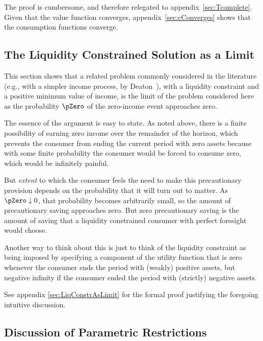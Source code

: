 \documentclass[titlepage]{\econtex}\providecommand{\texname}{BufferStockTheory}
\begin{document}
The proof is cumbersome, and therefore relegated to
appendix~\ref{sec:Tcomplete}.  Given that the value function
converges, appendix~\ref{sec:cConverges} shows that the consumption
functions converge.

\hypertarget{The-Liquidity-Constrained-Solution-as-a-Limit}{}
\subsection{The Liquidity Constrained Solution as a Limit} \label{sec:deatonIsLimit}

This section shows that a related problem commonly considered in the
literature (e.g., with a simpler income process, by
Deaton~\citeyearpar{deatonLiqConstr}), with a liquidity constraint
and a positive minimum value of income, is the limit of the problem
considered here as the probability $\pZero$ of the zero-income event
approaches zero.

The essence of the argument is easy to state.  As noted above, there is a finite possibility of earning zero income over the remainder of the horizon, which prevents
the consumer from ending the current period with zero assets because
with some finite probability the consumer would be forced to consume zero,
which would be infinitely painful.

But \textit{extent} to which the consumer feels the need to make this
precautionary provision depends on the probability that it will turn
out to matter.  As $\pZero \downarrow 0$, that probability becomes
arbitrarily small, so the amount of precautionary saving approaches zero.
But zero precautionary saving is the amount of saving that a liquidity
constrained consumer with perfect foresight would choose.

Another way to think about this is just to think of the liquidity
constraint as being imposed by specifying a component of the utility
function that is zero whenever the consumer ends the period with
(weakly) positive assets, but negative infinity if the consumer
ended the period with (strictly) negative assets.

See appendix \ref{sec:LiqConstrAsLimit} for the formal proof justifying the
foregoing intuitive discussion.

\hypertarget{Discussion-of-Parametric-Restrictions}{}
\subsection{Discussion of Parametric Restrictions}\label{sec:discussConvergence}
\end{document}
